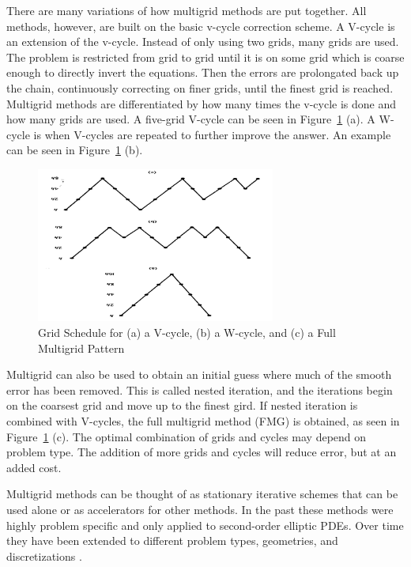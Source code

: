 There are many variations of how multigrid methods are put together. All methods, however, are built on the basic v-cycle correction scheme. A V-cycle is an extension of the v-cycle. Instead of only using two grids, many grids are used. The problem is restricted from grid to grid until it is on some grid which is coarse enough to directly invert the equations. Then the errors are prolongated back up the chain, continuously correcting on finer grids, until the finest grid is reached. Multigrid methods are differentiated by how many times the v-cycle is done and how many grids are used. A five-grid V-cycle can be seen in Figure~\ref{fig:Vcycle} (a). A W-cycle is when V-cycles are repeated to further improve the answer. An example can be seen in Figure~\ref{fig:Vcycle} (b). 
\begin{figure}
    \begin{center}
      \includegraphics [width=0.7\textwidth, height=0.7\textheight, angle=180 ] {multigridFig}
   \end{center}
   \caption{Grid Schedule for (a) a V-cycle, (b) a W-cycle, and (c) a Full Multigrid Pattern \cite{Briggs2000}}
   \label{fig:Vcycle}
\end{figure}

Multigrid can also be used to obtain an initial guess where much of the smooth error has been removed. This is called nested iteration, and the iterations begin on the coarsest grid and move up to the finest gird. If nested iteration is combined with V-cycles, the full multigrid method (FMG) is obtained, as seen in Figure~\ref{fig:Vcycle} (c). The optimal combination of grids and cycles may depend on problem type. The addition of more grids and cycles will reduce error, but at an added cost. 

Multigrid methods can be thought of as stationary iterative schemes that can be used alone or as accelerators for other methods. In the past these methods were highly problem specific and only applied to second-order elliptic PDEs. Over time they have been extended to different problem types, geometries, and discretizations \cite{Benzi2002}. 

